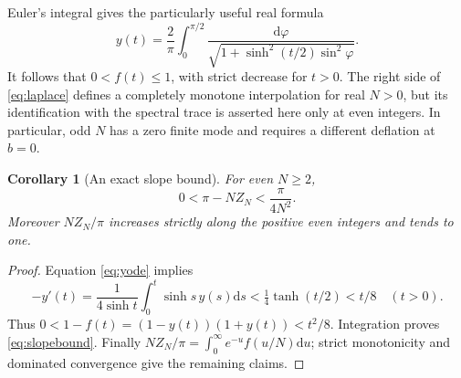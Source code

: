 \documentclass[10pt]{article}
\newtheorem{corollary}[theorem]{Corollary}
\newcommand{\dd}{\mathrm d}
\begin{document}
Euler's integral gives the particularly useful real formula
\begin{equation}
y(t)=\frac2\pi\int_0^{\pi/2}
\frac{\dd\varphi}{\sqrt{1+\sinh^2(t/2)\sin^2\varphi}}.
\label{eq:Euler}
\end{equation}
It follows that $0<f(t)\le1$, with strict decrease for $t>0$.
The right side of \eqref{eq:laplace} defines a completely monotone
interpolation for real $N>0$, but its identification with the spectral
trace is asserted here only at even integers. In particular, odd $N$
has a zero finite mode and requires a different deflation at $b=0$.

\begin{corollary}[An exact slope bound]
For even $N\ge2$,
\begin{equation}
0<\pi-NZ_N<\frac\pi{4N^2}.
\label{eq:slopebound}
\end{equation}
Moreover $NZ_N/\pi$ increases strictly along the positive even
integers and tends to one.
\end{corollary}
\begin{proof}
Equation \eqref{eq:yode} implies
\[
-y'(t)=\frac1{4\sinh t}\int_0^t\sinh s\,y(s)\dd s
<\tfrac14\tanh(t/2)<t/8\quad(t>0).
\]
Thus $0<1-f(t)=(1-y(t))(1+y(t))<t^2/8$.
Integration proves \eqref{eq:slopebound}.
Finally $NZ_N/\pi=\int_0^\infty e^{-u}f(u/N)\dd u$;
strict monotonicity and dominated convergence give the remaining claims.
\end{proof}
\end{document}
